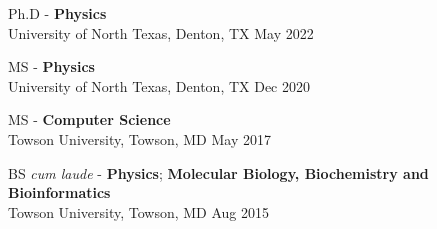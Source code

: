 \documentclass[overlapped, 10pt]{res} %
\begin{document}
\begin{resume}
Ph.D - \textbf{Physics} \\
University of North Texas, Denton, TX \hfill May 2022

MS - \textbf{Physics} \\
University of North Texas, Denton, TX \hfill  Dec 2020

MS - \textbf{Computer Science} \\
Towson University, Towson, MD \hfill May 2017

BS \textit{cum laude} - \textbf{Physics}; \textbf{Molecular Biology, Biochemistry and Bioinformatics} \\
Towson University, Towson, MD \hfill Aug 2015



\end{resume}
\end{document}
